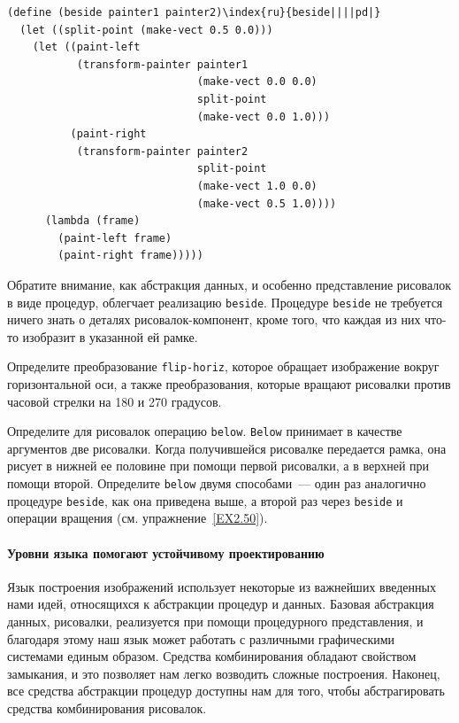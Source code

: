 \begin{Verbatim}[fontsize=\small]
(define (beside painter1 painter2)\index{ru}{beside||||pd|}
  (let ((split-point (make-vect 0.5 0.0)))
    (let ((paint-left
           (transform-painter painter1
                              (make-vect 0.0 0.0)
                              split-point
                              (make-vect 0.0 1.0)))
          (paint-right
           (transform-painter painter2
                              split-point
                              (make-vect 1.0 0.0)
                              (make-vect 0.5 1.0))))
      (lambda (frame)
        (paint-left frame)
        (paint-right frame)))))
\end{Verbatim}
Обратите внимание, как абстракция данных, и особенно представление
рисовалок в виде процедур, облегчает реализацию {\tt beside}.
Процедуре {\tt beside} не требуется ничего знать о деталях
рисовалок-компонент, кроме того, что каждая из них что-то изобразит в
указанной ей рамке.
\begin{exercise}{2.50}\label{EX2.50}%
Определите преобразование {\tt flip-horiz},
которое обращает изображение вокруг горизонтальной оси, а также
преобразования, которые вращают рисовалки против часовой стрелки на
180 и 270 градусов.
\end{exercise}
\begin{exercise}{2.51}\label{EX2.51}%
Определите для рисовалок операцию {\tt below}.
{\tt Below} принимает в качестве аргументов две рисовалки.
Когда получившейся рисовалке передается рамка, она рисует в нижней ее
половине при помощи первой рисовалки, а в верхней при помощи второй.
Определите {\tt below} двумя способами~--- один раз аналогично
процедуре {\tt beside}, как она приведена выше, а второй раз
через {\tt beside} и операции вращения (см. упражнение~\ref{EX2.50}).
\end{exercise}

\paragraph{Уровни языка помогают устойчивому проектированию}


Язык построения изображений использует некоторые из
важнейших введенных нами идей, относящихся к абстракции
процедур и данных.  Базовая абстракция данных, рисовалки, реализуется
при помощи процедурного представления, и благодаря этому наш язык может
работать с различными графическими системами единым образом.  Средства 
комбинирования обладают свойством замыкания, и это позволяет нам легко 
возводить сложные построения.  Наконец, все средства абстракции
процедур доступны нам для того, чтобы абстрагировать средства
комбинирования рисовалок.

